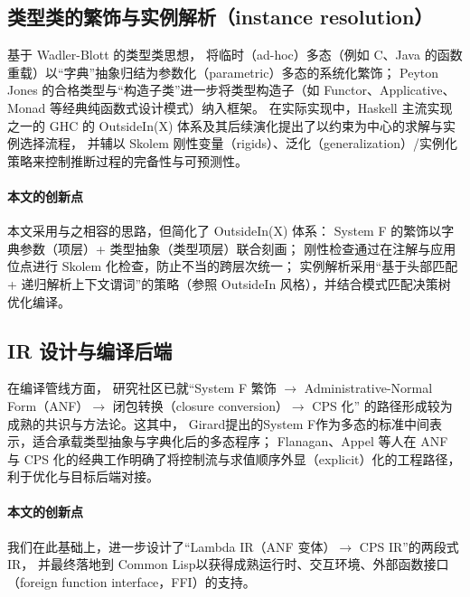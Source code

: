 \subsection{类型类的繁饰与实例解析（instance resolution）} 基于 Wadler-Blott 的类型类思想，
将临时（ad-hoc）多态（例如 C、Java 的函数重载）以“字典”抽象归结为参数化（parametric）多态的系统化繁饰；
Peyton Jones 的合格类型与“构造子类”进一步将类型构造子（如 Functor、Applicative、Monad 等经典纯函数式设计模式）纳入框架。
在实际实现中，Haskell 主流实现之一的 GHC 的 OutsideIn(X) 体系及其后续演化提出了以约束为中心的求解与实例选择流程，
并辅以 Skolem 刚性变量（rigids）、泛化（generalization）/实例化策略来控制推断过程的完备性与可预测性。

\paragraph{本文的创新点} 本文采用与之相容的思路，但简化了 OutsideIn(X) 体系：
System F 的繁饰以字典参数（项层）+ 类型抽象（类型项层）联合刻画；
刚性检查通过在注解与应用位点进行 Skolem 化检查，防止不当的跨层次统一；
实例解析采用“基于头部匹配 + 递归解析上下文谓词”的策略（参照 OutsideIn 风格），并结合模式匹配决策树优化编译。

\subsection{IR 设计与编译后端} 在编译管线方面，
研究社区已就“System F 繁饰 $\to$ Administrative-Normal Form（ANF）$\to$ 闭包转换（closure conversion）$\to$ CPS 化”
的路径形成较为成熟的共识与方法论。这其中，
Girard提出的System F作为多态\lambdacalc 的标准中间表示，适合承载类型抽象与字典化后的多态程序；
Flanagan、Appel 等人在 ANF 与 CPS 化的经典工作明确了将控制流与求值顺序外显（explicit）化的工程路径，
利于优化与目标后端对接。

\paragraph{本文的创新点}我们在此基础上，进一步设计了“Lambda IR（ANF 变体）$\to$ CPS IR”的两段式IR，
并最终落地到 Common Lisp以获得成熟运行时、交互环境、外部函数接口（foreign function interface，FFI）的支持。

